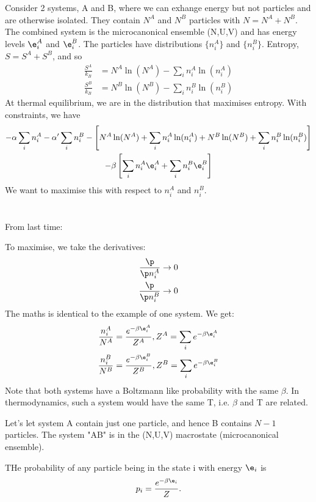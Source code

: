 \documentclass[a4paper, 11pt, normalem]{report}
\begin{document}
Consider 2 systems, A and B, where we can exhange energy but not particles and are otherwise isolated.
They contain $N^A$ and $N^B$ particles with $N = N^A + N^B$.
The combined system is the microcanonical ensemble (N,U,V) and has energy levels $\e_i^A$ and $\e_i^B$.
The particles have distributions $\{n_i^A\}$ and $\{n_i^B\}$.
Entropy, $S = S^A + S^B$, and so
\begin{align}
    \frac{S^A}{k_B} &= N^A\ln(N^A) - \sum_i n_i^A\ln(n_i^A) \\
    \frac{S^B}{k_B} &= N^B\ln(N^B) - \sum_i n_i^B\ln(n_i^B)
\end{align}
At thermal equilibrium, we are in the distribution that maximises entropy.
With constraints, we have
\begin{multline}
    -\alpha\sum_i n_i^A - \alpha'\sum_i n_i^B - \left[N^A\ln(N^A) + \sum_i n_i^A\ln(n_i^A) + N^B\ln(N^B) + \sum_i n_i^B\ln(n_i^B)\right] \\ -\beta\left[\sum_i n_i^A\e_i^A + \sum_i n_i^B\e_i^B\right]
\end{multline}
We want to maximise this with respect to $n_i^A$ and $n_i^B$.

\chapter{}
From last time:

To maximise, we take the derivatives:
\begin{align}
    \frac{\p}{\p n_i^A} &\to 0 \\
    \frac{\p}{\p n_i^B} &\to 0
\end{align}
The maths is identical to the example of one system.
We get:
\begin{align}
    \frac{n_i^A}{N^A} &= \frac{e^{-\beta\e_i^A}}{Z^A}, Z^A = \sum_i e^{-\beta\e_i^A} \\
    \frac{n_i^B}{N^B} &= \frac{e^{-\beta\e_i^B}}{Z^B}, Z^B = \sum_i e^{-\beta\e_i^B}
\end{align}
Note that both systems have a Boltzmann like probability with the same $\beta$.
In thermodynamics, such a system would have the same T, i.e. $\beta$ and T are related.

Let's let system A contain just one particle, and hence B contains $N-1$ particles.
The system "AB" is in the (N,U,V) macrostate (microcanonical ensemble).

THe probability of any particle being in the state i with energy $\e_i$ is
\begin{equation}
    p_i = \frac{e^{-\beta\e_i}}{Z}.
\end{equation}
\end{document}
